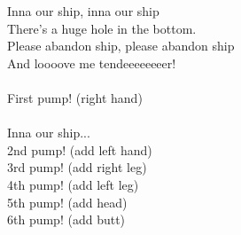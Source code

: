 
            Inna our ship, inna our ship  \\
            There’s a huge hole in the bottom.  \\
            Please abandon ship, please abandon ship  \\
            And loooove me tendeeeeeeeer! \\
\hspace{10mm} \\
            First pump! (right hand) \\
\hspace{10mm} \\
            Inna our ship... \\
            2nd pump! (add left hand) \\
            3rd pump! (add right leg) \\
            4th pump! (add left leg) \\
            5th pump! (add head) \\
            6th pump! (add butt) \\

